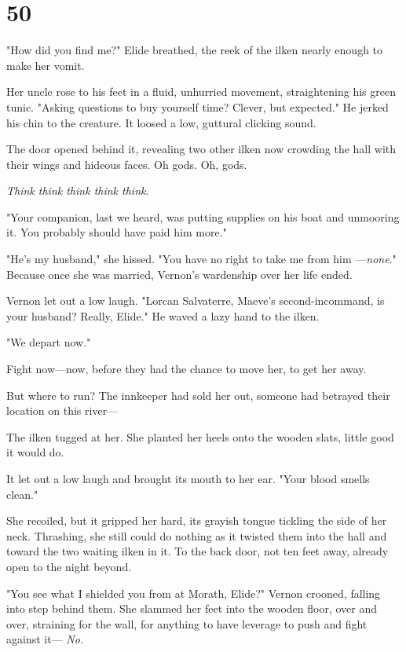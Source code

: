 
\chapter{50}

"How did you find me?" Elide breathed, the reek of the ilken nearly enough to make her vomit.

Her uncle rose to his feet in a fluid, unhurried movement, straightening his green tunic. "Asking questions to buy yourself time? Clever, but expected." He jerked his chin to the creature. It loosed a low, guttural clicking sound.

The door opened behind it, revealing two other ilken now crowding the hall with their wings and hideous faces. Oh gods. Oh, gods.

\emph{Think think think think think}.

"Your companion, last we heard, was putting supplies on his boat and unmooring it. You probably should have paid him more."

"He's my husband," she hissed. "You have no right to take me from him ---\emph{none}." Because once she was married, Vernon's wardenship over her life ended.

Vernon let out a low laugh. "Lorcan Salvaterre, Maeve's second-incommand, is your husband? Really, Elide." He waved a lazy hand to the ilken.

"We depart now."

Fight now---now, before they had the chance to move her, to get her away.

But where to run? The innkeeper had sold her out, someone had betrayed their location on this river---

The ilken tugged at her. She planted her heels onto the wooden slats, little good it would do.

It let out a low laugh and brought its mouth to her ear. "Your blood smells clean."

She recoiled, but it gripped her hard, its grayish tongue tickling the side of her neck. Thrashing, she still could do nothing as it twisted them into the hall and toward the two waiting ilken in it. To the back door, not ten feet away, already open to the night beyond.

"You see what I shielded you from at Morath, Elide?" Vernon crooned, falling into step behind them. She slammed her feet into the wooden floor, over and over, straining for the wall, for anything to have leverage to push and fight against it--- \emph{No.}

